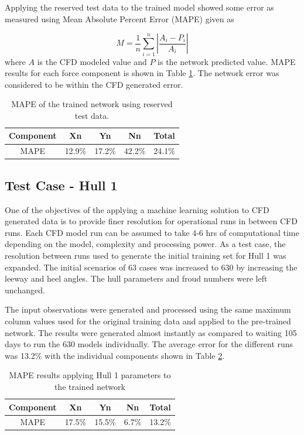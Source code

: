 \documentclass[twoside,twocolumn]{article}
\begin{document}
	Applying the reserved test data to the trained model showed some error as measured using Mean Absolute Percent Error (MAPE) given as 
	
	\begin{equation}
	M = \frac{1}{n}\sum_{i=1}^{n}\left | \frac{A_{i}-P_{i}}{A_{i}} \right |
	\end{equation}
	\noident
	where $A$ is the CFD modeled value and $P$ is the network predicted value. MAPE results for each force component is shown in Table \ref{tab:test_results}. The network error was considered to be within the CFD generated error.
	
	\begin{table}[]
		\centering
		\caption{MAPE of the trained network using reserved test data.}
		\label{tab:test_results}
		\begin{tabular}{@{}ccccc@{}}
			\toprule
			\textbf{Component} & \textbf{Xn} & \textbf{Yn} & \textbf{Nn} & \textbf{Total} \\ \midrule
			MAPE & 12.9\% & 17.2\% & 42.2\% & 24.1\% \\ \bottomrule
		\end{tabular}
	\end{table}
	
	\subsection{Test Case - Hull 1}
	One of the objectives of the applying a machine learning solution to CFD generated data is to provide finer resolution for operational runs in between CFD runs. Each CFD model run can be assumed to take 4-6 hrs of computational time depending on the model, complexity and processing power. As a test case, the resolution between runs used to generate the initial training set for Hull 1 was expanded. The initial scenarios of 63 cases was increased to 630 by increasing the leeway and heel angles. The hull parameters and froud numbers were left unchanged. 
	
	The input observations were generated and processed using the same maximum column values used for the original training data and applied to the pre-trained network. The results were generated almost instantly as compared to waiting 105 days to run the 630 models individually. The average error for the different runs was 13.2\% with the individual components shown in Table \ref{tab:hull1_results}.
	
	\begin{table}[]
		\centering
		\caption{MAPE results applying Hull 1 parameters to the trained network}
		\label{tab:hull1_results}
		\begin{tabular}{@{}ccccc@{}}
			\toprule
			\textbf{Component} & \textbf{Xn} & \textbf{Yn} & \textbf{Nn} & \textbf{Total} \\ \midrule
			MAPE & 17.5\% & 15.5\% & 6.7\% & 13.2\% \\ \bottomrule
		\end{tabular}
	\end{table}
	
\end{document}
